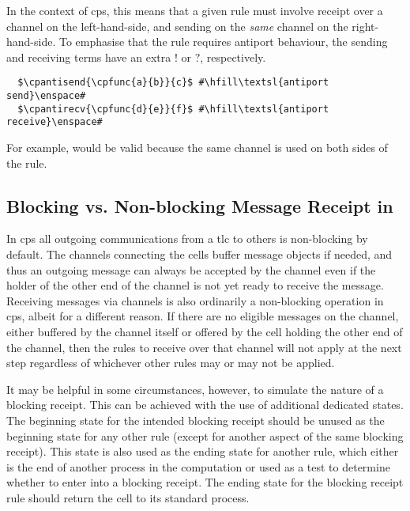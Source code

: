 In the context of \gls{cps}, this means that a given rule must involve receipt over a channel on the left-hand-side, and sending on the \emph{same} channel on the right-hand-side.  To emphasise that the rule requires antiport behaviour, the sending and receiving terms have an extra \(!\) or \(?\), respectively.

\lstset{xleftmargin=.5in, xrightmargin=.5in} 
\begin{lstlisting}
  $\cpantisend{\cpfunc{a}{b}}{c}$ #\hfill\textsl{antiport send}\enspace#
  $\cpantirecv{\cpfunc{d}{e}}{f}$ #\hfill\textsl{antiport receive}\enspace#
\end{lstlisting}

For example,  would be valid because the same channel is used on both sides of the rule.

\subsection{\label{sec:cps:blocking}Blocking vs. Non-blocking Message Receipt in }

In \gls{cps} all outgoing communications from a \gls{tlc} to others is non-blocking by default.  The channels connecting the cells buffer message objects if needed, and thus an outgoing message can always be accepted by the channel even if the holder of the other end of the channel is not yet ready to receive the message.  Receiving messages via channels is also ordinarily a non-blocking operation in \gls{cps}, albeit for a different reason.  If there are no eligible messages on the channel, either buffered by the channel itself or offered by the cell holding the other end of the channel, then the rules to receive over that channel will not apply at the next step regardless of whichever other rules may or may not be applied.

It may be helpful in some circumstances, however, to simulate the nature of a blocking receipt.  This can be achieved with the use of additional dedicated states.  The beginning state for the intended blocking receipt should be unused as the beginning state for any other rule (except for another aspect of the same blocking receipt).  This state is also used as the ending state for another rule, which either is the end of another process in the computation or used as a test to determine whether to enter into a blocking receipt.  The ending state for the blocking receipt rule should return the cell to its standard process.

